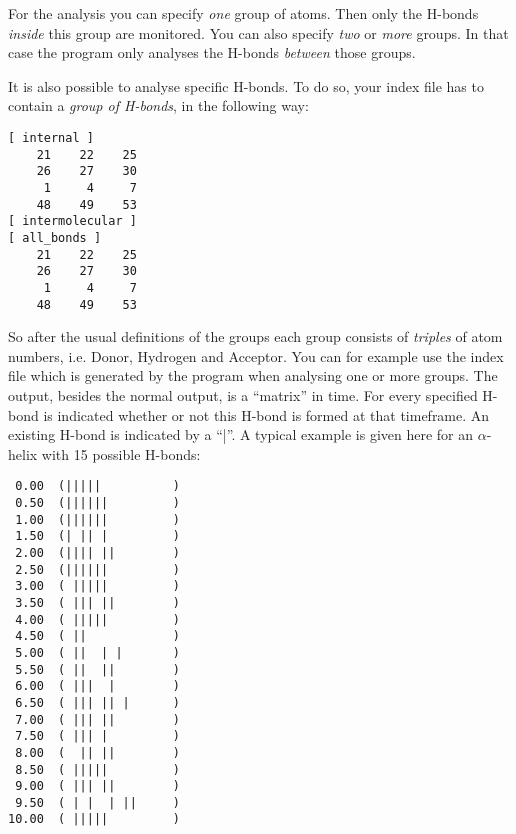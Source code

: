 For the analysis you can specify {\em one} group of atoms. Then only the 
H-bonds {\em inside} this group are monitored. You can also specify {\em two} 
or {\em more} groups. In that case the program only analyses the H-bonds 
{\em between} those groups. 

It is also possible to analyse specific H-bonds. To do so, your index file has 
to contain a {\em group of H-bonds}, in the following way:
{\samepage
\begin{verbatim}
[ internal ]
    21    22    25
    26    27    30
     1     4     7
    48    49    53
[ intermolecular ]   
[ all_bonds ] 
    21    22    25
    26    27    30
     1     4     7
    48    49    53
\end{verbatim}
}
So after the usual definitions of the groups each group consists of 
{\em triples} of atom numbers, i.e. Donor, Hydrogen and Acceptor. 
You can for example use the index file which is generated by the program when 
analysing one or more groups. The output, besides the normal output, is a 
``matrix'' in time. For every specified H-bond is indicated whether or not 
this H-bond is formed at that timeframe. An existing H-bond is indicated by 
a ``|''. A typical example is given here for an $\alpha$-helix with 15 
possible H-bonds:
{\small 
\begin{verbatim} 
 0.00  (|||||          )
 0.50  (||||||         )
 1.00  (||||||         )
 1.50  (| || |         )
 2.00  (|||| ||        )
 2.50  (||||||         )
 3.00  ( |||||         )
 3.50  ( ||| ||        )
 4.00  ( |||||         )
 4.50  ( ||            )
 5.00  ( ||  | |       )
 5.50  ( ||  ||        )
 6.00  ( |||  |        )
 6.50  ( ||| || |      )
 7.00  ( ||| ||        )
 7.50  ( ||| |         )
 8.00  (  || ||        )
 8.50  ( |||||         )
 9.00  ( ||| ||        )
 9.50  ( | |  | ||     )
10.00  ( |||||         )
\end{verbatim} }

